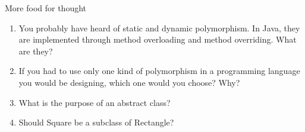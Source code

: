 \begin{frame}{More food for thought}
    \begin{enumerate}
        \item You probably have heard of static and dynamic polymorphism. In Java, they are implemented through method overloading and method overriding. What are they? \pause
        \item If you had to use only one kind of polymorphism in a programming language you would be designing, which one would you choose? Why? \pause
        \item What is the purpose of an abstract class? \pause %
        \item Should Square be a subclass of Rectangle? \pause %
        
        
        
        
    \end{enumerate}
    
    
\end{frame}